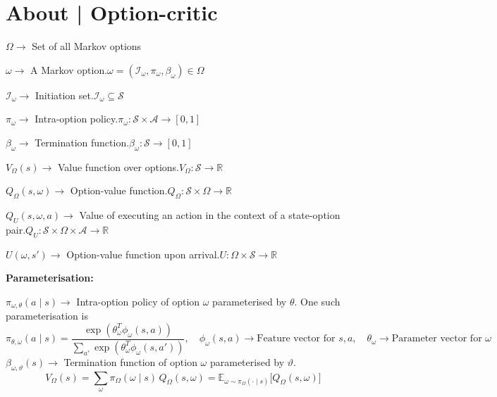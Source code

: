 \section*{About | Option-critic~\cite{bacon2017option, Sutton1999}}

\( \Omega \to \) Set of all Markov options

\( \omega \to \) A Markov option.\@ \( \omega = (\mathcal{I}_\omega, \pi_\omega, \beta_\omega) \in \Omega \)

\( \mathcal{I}_\omega \to \) Initiation set.\@ \( \mathcal{I}_\omega \subseteq \mathcal{S} \)

\( \pi_\omega \to \) Intra-option policy.\@ \( \pi_\omega: \mathcal{S} \times \mathcal{A} \to [0, 1] \)

\( \beta_\omega \to \) Termination function.\@ \( \beta_\omega: \mathcal{S} \to [0, 1] \)

\( V_\Omega(s) \to \) Value function over options.\@ \( V_\Omega: \mathcal{S} \to \mathbb{R} \)

\( Q_\Omega(s, \omega) \to \) Option-value function.\@ \( Q_\Omega: \mathcal{S} \times \Omega \to \mathbb{R} \)

\( Q_U(s, \omega, a) \to \) Value of executing an action in the context of a state-option pair.\@ \( Q_U: \mathcal{S} \times \Omega \times \mathcal{A} \to \mathbb{R} \)

\( U(\omega, s') \to \) Option-value function upon arrival.\@ \( U: \Omega \times \mathcal{S} \to \mathbb{R} \)

\textbf{Parameterisation:}

\( \pi_{\omega, \theta}(a \mid s) \to \) Intra-option policy of option \( \omega \) parameterised by \( \theta \).
One such parameterisation is
\begin{equation}
    \pi_{\theta, \omega}(a \mid s)
    =
    \frac{\exp(\theta_\omega^T \phi_\omega(s, a))}{\sum_{a'} \exp(\theta_\omega^T \phi_\omega(s, a'))}
    , \quad
    \phi_\omega(s, a)
    \to
    \text{Feature vector for } s, a
    , \quad
    \theta_\omega
    \to
    \text{Parameter vector for } \omega
\end{equation}
\( \beta_{\omega, \vartheta}(s) \to \) Termination function of option \( \omega \) parameterised by \( \vartheta \).
\begin{equation}
    V_\Omega(s)
    =
    \sum_{\omega} \pi_\Omega(\omega \mid s) \, Q_\Omega(s, \omega)
    =
    \mathbb{E}_{\omega \sim \pi_\Omega(\cdot \mid s)} \Big[ Q_\Omega(s, \omega) \Big]
    \label{eq:V_Omega}
\end{equation}

